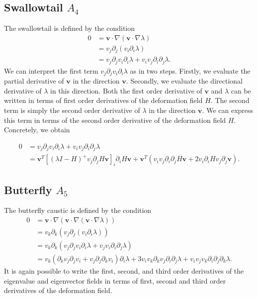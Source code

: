 \documentclass{article}
\begin{document}
\subsection{Swallowtail $A_4$}
The swallowtail is defined by the condition
\begin{align}
0
&= \bm{v} \cdot \nabla (\bm{v} \cdot \nabla \lambda)\\
&= v_j \partial_j(v_i \partial_i \lambda)\\
&= v_j \partial_j v_i \partial_i \lambda + v_i v_j   \partial_i \partial_j \lambda.
\end{align}
We can interpret the first term $v_j \partial_j v_i \partial_i \lambda $ as in two steps. Firstly, we evaluate the partial derivative of $\bm{v}$ in the direction $\bm{v}$. Secondly, we evaluate the directional derivative of $\lambda$ in this direction. Both the first order derivative of $\bm{v}$ and $\lambda$ can be written in terms of first order derivatives of the deformation field $H$. The second term is simply the second order derivative of $\lambda$ in the direction $\bm{v}$. We can express this term in terms of the second order derivative of the deformation field $H$. Concretely, we obtain

\begin{align}
0&= v_j \partial_j v_i \partial_i \lambda + v_i v_j   \partial_i \partial_j \lambda\\
&= \bm{v}^T[(\lambda I - H)^+ v_j\partial_j H \bm{v}]_i\partial_i H \bm{v}     + \bm{v}^T ( v_i v_j \partial_i \partial_j H \bm{v} +  2 v_i  \partial_i H v_j\partial_j \bm{v} ).
\end{align}


\subsection{Butterfly $A_5$}
The butterfly caustic is defined by the condition
\begin{align}
0
&=\bm{v}\cdot \nabla( \bm{v} \cdot \nabla (\bm{v} \cdot \nabla \lambda))\\
&= v_k \partial_k(v_j \partial_j(v_i \partial_i \lambda))\\
&= v_k \partial_k(v_j \partial_j v_i \partial_i \lambda + v_j  v_i \partial_i \partial_j \lambda)\\
&= 
v_k (\partial_k v_j \partial_j v_i + v_j \partial_j\partial_k v_i)\partial_i \lambda 
+ 3 v_i v_k \partial_k v_j \partial_i \partial_j \lambda
+ v_i v_j v_k \partial_i \partial_j \partial_k \lambda.
\end{align}
It is again possible to write the first, second, and third order derivatives of the eigenvalue and eigenvector fields in terms of first, second and third order derivatives of the deformation field. 
\end{document}
